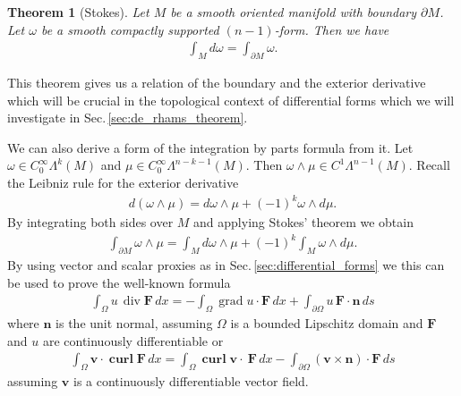 \documentclass[12pt,a4paper]{article}
\numberwithin{equation}{subsection}
\numberwithin{lemma}{subsection}
\newtheorem{theorem}[lemma]{Theorem}
\theoremstyle{definition}
\DeclareMathOperator{\curl}{curl}
\DeclareMathOperator{\diver}{div}
\DeclareMathOperator{\grad}{grad}
\begin{document}
\begin{theorem}[Stokes]
    Let $M$ be a smooth oriented manifold with boundary 
    $\partial M$. Let $\omega$ be 
    a smooth compactly supported $(n-1)$-form. Then we have 
    \begin{align*}
        \int_M d\omega = \int_{\partial M} \omega.
    \end{align*}
\end{theorem}
This theorem gives us a relation of the boundary and the exterior derivative 
which will be crucial in the topological context of differential forms 
which we will investigate in Sec.\,\ref{sec:de_rhams_theorem}. 

We can also derive a form of the integration by parts formula from it. 
Let $\omega \in C_0^\infty \Lambda^k (M)$ and $\mu \in C_0^\infty \Lambda^{n-k-1}(M)$. 
Then $\omega \wedge \mu \in C^1 \Lambda^{n-1} (M)$. Recall the 
Leibniz rule for the exterior derivative 
\begin{align*}
    d(\omega \wedge \mu) = d\omega \wedge \mu + (-1)^k \omega \wedge d\mu. 
\end{align*}
By integrating both sides over $M$ and applying Stokes' theorem we obtain
\begin{align*}
    \int_{\partial M} \omega \wedge \mu 
    = \int_M d\omega \wedge \mu + (-1)^k \int_M \omega \wedge d\mu.
\end{align*}
By using vector and scalar proxies as in Sec.\,\ref{sec:differential_forms}
we this can be used to prove the well-known formula
\begin{align*}
    \int_\Omega u\,\diver \mathbf{F} \, dx 
    =  - \int_\Omega \grad u \cdot \mathbf{F} \, dx + 
        \int_{\partial \Omega } u \, \mathbf{F}\cdot \mathbf{n} \, ds
\end{align*}
where $\mathbf{n}$ is the unit normal, assuming $\Omega$ is a bounded Lipschitz domain
and $\mathbf{F}$ and $u$ are continuously differentiable 
or 
\begin{align*}
    \int_\Omega \mathbf{v} \cdot \mathbf{\curl} \mathbf{F} \, dx
    = \int_\Omega \mathbf{\curl} \mathbf{v} \cdot \ \mathbf{F} \, dx
        - \int_{\partial \Omega } (\mathbf{v} \times \mathbf{n})\cdot \mathbf{F} \, ds
\end{align*}
assuming $\mathbf{v}$ is a continuously differentiable vector field.
\end{document}
